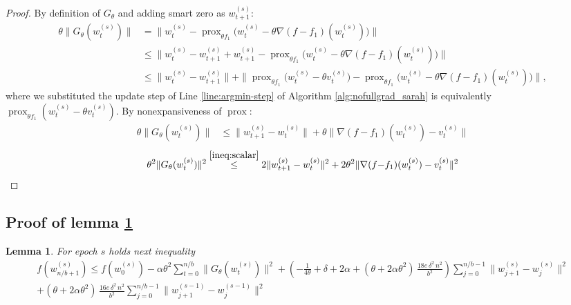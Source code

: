 \documentclass{article}
\DeclareMathOperator{\prox}{prox}
\newtheorem{lemma}{Lemma}
\begin{document}
\begin{proof}
By definition of $G_\theta$ and adding smart zero as $w_{t+1}^{(s)}$:
\begin{align*}
\theta\|G_\theta(w_t^{(s)})\| 
&= \|w_t^{(s)} - \operatorname{prox}_{\theta f_1}
\big(w_t^{(s)} - \theta\nabla(f{-}f_1)(w_t^{(s)})\big)\| \\
&\leq \|w_t^{(s)} - w_{t+1}^{(s)} 
+ w_{t+1}^{(s)} - \operatorname{prox}_{\theta f_1}
\big(w_t^{(s)} - \theta\nabla(f{-}f_1)(w_t^{(s)})\big)\| \\
&\leq \|w_t^{(s)} - w_{t+1}^{(s)}\| 
+ \|\operatorname{prox}_{\theta f_1}
\big(w_t^{(s)} - \theta v_t^{(s)}\big) 
- \operatorname{prox}_{\theta f_1}
\big(w_t^{(s)} - \theta\nabla(f{-}f_1)(w_t^{(s)})\big)\|,
\end{align*}
where we substituted the update step of Line \ref{line:argmin-step} of Algorithm \ref{alg:nofullgrad_sarah} is equivalently $\prox_{\theta f_1}\!\left(w_t^{(s)} - \theta v_t^{(s)}\right)$.
By nonexpansiveness of $\prox$:
\begin{align*}
\theta\|G_\theta(w_t^{(s)})\| 
& \leq \|w_{t+1}^{(s)} - w_t^{(s)}\| 
+ \theta\|\nabla(f{-}f_1)(w_t^{(s)}) - v_t^{(s)}\| 
\end{align*}
\[
 \theta^2\|G_\theta(w_t^{(s)})\|^2 
\overset{\eqref{ineq:scalar}}{\leq}
2\|w_{t+1}^{(s)} - w_t^{(s)}\|^2 
+ 2\theta^2\|\nabla(f{-}f_1)(w_t^{(s)}) - v_t^{(s)}\|^2 
\qedhere
\]
\end{proof}

\subsection{Proof of lemma \ref{lem:epoch_descent}}

\begin{lemma}
\label{lem:epoch_descent}
    For epoch $s$ holds next inequality 
    \begin{multline*}
        f(w_{n/b+1}^{(s)}) \leq f(w_0^{(s)}) 
  - \alpha \theta^2 \sum_{t=0}^{n/b}\|G_\theta(w_t^{(s)})\|^2 
  + \left(-\frac{1}{4\theta} + \delta + 2\alpha
    + (\theta + 2\alpha \theta^2)\,\frac{18e\,\delta^2\,n^2}{b^2}\right)
    \sum_{j=0}^{n/b-1}\|w_{j+1}^{(s)} - w_j^{(s)}\|^2 \\
  + (\theta + 2\alpha\theta^2)\,\frac{16e\,\delta^2\,n^2}{b^2}
    \sum_{j=0}^{n/b - 1}\|w_{j+1}^{(s-1)} - w_j^{(s-1)}\|^2
    \end{multline*}
\end{lemma}
\end{document}
